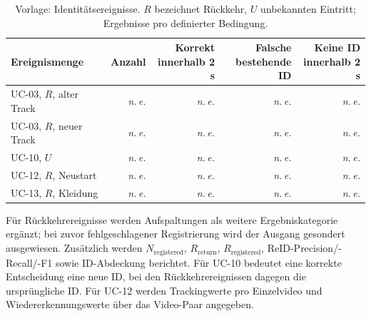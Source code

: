 \documentclass[runningheads]{llncs}
\newcommand{\evalpending}{\textit{n.\,e.}}
\begin{document}
\begin{table}[tbp]
\caption{Vorlage: Identitätsereignisse. $R$ bezeichnet Rückkehr, $U$ unbekannten Eintritt; Ergebnisse pro definierter Bedingung.}
\label{tab:eval-result-reid}
\centering
\small
\begin{tabularx}{\linewidth}{@{}Xrrrr@{}}
\toprule
Ereignismenge & Anzahl & \shortstack{Korrekt\\innerhalb 2 s} & \shortstack{Falsche\\bestehende ID} & \shortstack{Keine ID\\innerhalb 2 s} \\
\midrule
UC-03, $R$, alter Track & \evalpending & \evalpending & \evalpending & \evalpending \\
UC-03, $R$, neuer Track & \evalpending & \evalpending & \evalpending & \evalpending \\
UC-10, $U$ & \evalpending & \evalpending & \evalpending & \evalpending \\
UC-12, $R$, Neustart & \evalpending & \evalpending & \evalpending & \evalpending \\
UC-13, $R$, Kleidung & \evalpending & \evalpending & \evalpending & \evalpending \\
\bottomrule
\end{tabularx}
\end{table}

Für Rückkehrereignisse werden Aufspaltungen als weitere Ergebniskategorie ergänzt; bei zuvor fehlgeschlagener Registrierung wird der Ausgang gesondert ausgewiesen. Zusätzlich werden $N_{\mathrm{registered}}$, $R_{\mathrm{return}}$, $R_{\mathrm{registered}}$, ReID-Precision/-Recall/-F1 sowie ID-Abdeckung berichtet. Für UC-10 bedeutet eine korrekte Entscheidung eine neue ID, bei den Rückkehrereignissen dagegen die ursprüngliche ID. Für UC-12 werden Trackingwerte pro Einzelvideo und Wiedererkennungswerte über das Video-Paar angegeben.
\end{document}
